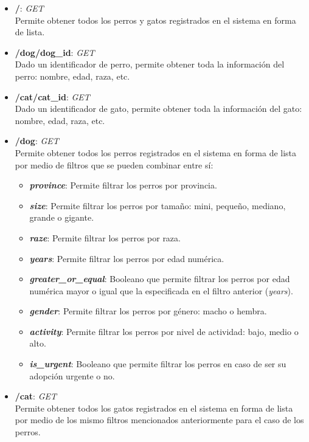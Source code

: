 \begin{itemize}
    \item \textbf{/}: \textit{GET} \\
    Permite obtener todos los perros y gatos registrados en el sistema en forma de lista.
    \item \textbf{/dog/{dog\_id}}: \textit{GET} \\
    Dado un identificador de perro, permite obtener toda la información del perro: nombre, edad, raza, etc.
    \item \textbf{/cat/{cat\_id}}: \textit{GET} \\
    Dado un identificador de gato, permite obtener toda la información del gato: nombre, edad, raza, etc.
    \item \textbf{/dog}: \textit{GET} \\
    Permite obtener todos los perros registrados en el sistema en forma de lista por medio de filtros que se pueden combinar entre sí:
        \begin{itemize}
            \item \textbf{\textit{province}}: Permite filtrar los perros por provincia.
            \item \textbf{\textit{size}}: Permite filtrar los perros por tamaño: mini, pequeño, mediano, grande o gigante.
            \item \textbf{\textit{raze}}: Permite filtrar los perros por raza.
            \item \textbf{\textit{years}}: Permite filtrar los perros por edad numérica.
            \item \textbf{\textit{greater\_or\_equal}}: Booleano que permite filtrar los perros por edad numérica mayor o igual que la especificada en el filtro anterior (\textit{years}).
            \item \textbf{\textit{gender}}: Permite filtrar los perros por género: macho o hembra.
            \item \textbf{\textit{activity}}: Permite filtrar los perros por nivel de actividad: bajo, medio o alto.
            \item \textbf{\textit{is\_urgent}}: Booleano que permite filtrar los perros en caso de ser su adopción urgente o no.
        \end{itemize}
    \item \textbf{/cat}: \textit{GET} \\
    Permite obtener todos los gatos registrados en el sistema en forma de lista por medio de los mismo filtros mencionados anteriormente para el caso de los perros.

\end{itemize}
